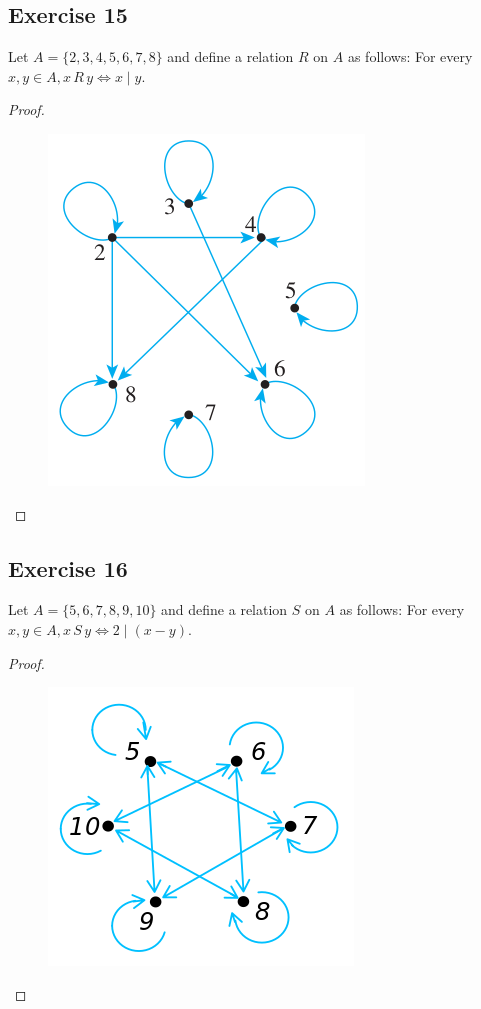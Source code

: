 \documentclass[14pt]{extarticle}
\begin{document}
\subsection{Exercise 15}
Let \(A = \{2, 3, 4, 5, 6, 7, 8\}\) and define a relation $R$ on $A$ as follows: For every \(x, y \in A, x \, R\, y
\iff x \mid y\).

\begin{proof}
        \begin{figure}[ht!]
                \centering
                \includegraphics[scale=0.4]{../images/8.1.15.png}
        \end{figure}
\end{proof}

\subsection{Exercise 16}
Let \(A = \{5, 6, 7, 8, 9, 10\}\) and define a relation $S$ on $A$ as follows: For every \(x, y \in A, x \, S \, y \iff
2 \mid (x - y)\).

\begin{proof}
        \begin{figure}[ht!]
                \centering
                \includegraphics[scale=0.4]{../images/8.1.16.png}
        \end{figure}
\end{proof}
\end{document}
